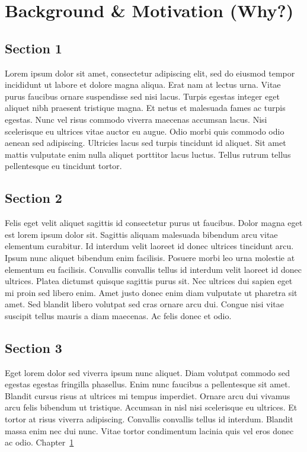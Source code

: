 \documentclass[
  BCOR=10mm, %
  DIV=12, %
  twoside, %
  headsepline, %
  listof=totoc, %
  bibliography=totoc, %
  index=totoc, %
  abstract=true, %
  numbers=noenddot, %
]{cs-thesis}
\begin{document}

    \chapter{Background \& Motivation (Why?)}\label{sec-background}

    \section{Section 1}\label{section-1}

    Lorem ipsum dolor sit amet, consectetur adipiscing elit, sed do
    eiusmod tempor incididunt ut labore et dolore magna aliqua. Erat nam
    at lectus urna. Vitae purus faucibus ornare suspendisse sed nisi
    lacus. Turpis egestas integer eget aliquet nibh praesent tristique
    magna. Et netus et malesuada fames ac turpis egestas. Nunc vel risus
    commodo viverra maecenas accumsan lacus. Nisi scelerisque eu
    ultrices vitae auctor eu augue. Odio morbi quis commodo odio aenean
    sed adipiscing. Ultricies lacus sed turpis tincidunt id aliquet. Sit
    amet mattis vulputate enim nulla aliquet porttitor lacus luctus.
    Tellus rutrum tellus pellentesque eu tincidunt tortor.

    \section{Section 2}\label{sec-sec2}

    Felis eget velit aliquet sagittis id consectetur purus ut faucibus.
    Dolor magna eget est lorem ipsum dolor sit. Sagittis aliquam
    malesuada bibendum arcu vitae elementum curabitur. Id interdum velit
    laoreet id donec ultrices tincidunt arcu. Ipsum nunc aliquet
    bibendum enim facilisis. Posuere morbi leo urna molestie at
    elementum eu facilisis. Convallis convallis tellus id interdum velit
    laoreet id donec ultrices. Platea dictumst quisque sagittis purus
    sit. Nec ultrices dui sapien eget mi proin sed libero enim. Amet
    justo donec enim diam vulputate ut pharetra sit amet. Sed blandit
    libero volutpat sed cras ornare arcu dui. Congue nisi vitae suscipit
    tellus mauris a diam maecenas. Ac felis donec et odio.

    \section{Section 3}\label{section-3}

    Eget lorem dolor sed viverra ipsum nunc aliquet. Diam volutpat
    commodo sed egestas egestas fringilla phasellus. Enim nunc faucibus
    a pellentesque sit amet. Blandit cursus risus at ultrices mi tempus
    imperdiet. Ornare arcu dui vivamus arcu felis bibendum ut tristique.
    Accumsan in nisl nisi scelerisque eu ultrices. Et tortor at risus
    viverra adipiscing. Convallis convallis tellus id interdum. Blandit
    massa enim nec dui nunc. Vitae tortor condimentum lacinia quis vel
    eros donec ac odio. Chapter~\ref{sec-background}
\end{document}
